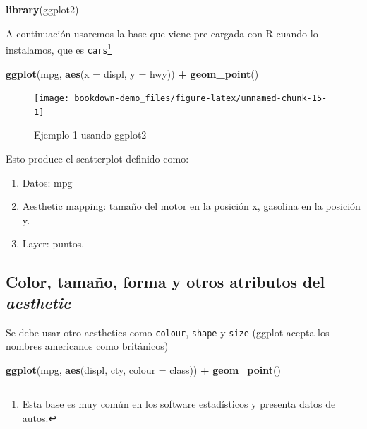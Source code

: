 \documentclass[12pt,]{book}
\newenvironment{Shaded}{\begin{snugshade}}{\end{snugshade}}
\newcommand{\KeywordTok}[1]{\textcolor[rgb]{0.13,0.29,0.53}{\textbf{#1}}}
\newcommand{\DataTypeTok}[1]{\textcolor[rgb]{0.13,0.29,0.53}{#1}}
\newcommand{\StringTok}[1]{\textcolor[rgb]{0.31,0.60,0.02}{#1}}
\newcommand{\OperatorTok}[1]{\textcolor[rgb]{0.81,0.36,0.00}{\textbf{#1}}}
\newcommand{\NormalTok}[1]{#1}
\providecommand{\tightlist}{%
  \setlength{\itemsep}{0pt}\setlength{\parskip}{0pt}}
\begin{document}
\begin{Shaded}
\begin{Highlighting}[]
\KeywordTok{library}\NormalTok{(ggplot2)}
\end{Highlighting}
\end{Shaded}

A continuación usaremos la base que viene pre cargada con R cuando lo
instalamos, que es \texttt{cars}\footnote{Esta base es muy común en los
  software estadísticos y presenta datos de autos.}

\begin{Shaded}
\begin{Highlighting}[]
\KeywordTok{ggplot}\NormalTok{(mpg, }\KeywordTok{aes}\NormalTok{(}\DataTypeTok{x =}\NormalTok{ displ, }\DataTypeTok{y =}\NormalTok{ hwy)) }\OperatorTok{+}\StringTok{ }\KeywordTok{geom_point}\NormalTok{()}
\end{Highlighting}
\end{Shaded}

\begin{figure}

{\centering \texttt{[image: bookdown-demo\_files/figure-latex/unnamed-chunk-15-1]} 

}

\caption{Ejemplo 1 usando ggplot2}\label{fig:unnamed-chunk-15}
\end{figure}

Esto produce el scatterplot definido como:

\begin{enumerate}
\def\labelenumi{\arabic{enumi}.}
\tightlist
\item
  Datos: mpg
\item
  Aesthetic mapping: tamaño del motor en la posición x, gasolina en la
  posición y.
\item
  Layer: puntos.
\end{enumerate}

\subsection{\texorpdfstring{Color, tamaño, forma y otros atributos del
\emph{aesthetic}}{Color, tamaño, forma y otros atributos del aesthetic}}\label{color-tamano-forma-y-otros-atributos-del-aesthetic}

Se debe usar otro aesthetics como \texttt{colour}, \texttt{shape} y
\texttt{size} (ggplot acepta los nombres americanos como británicos)

\begin{Shaded}
\begin{Highlighting}[]
\KeywordTok{ggplot}\NormalTok{(mpg, }\KeywordTok{aes}\NormalTok{(displ, cty, }\DataTypeTok{colour =}\NormalTok{ class)) }\OperatorTok{+}
\StringTok{  }\KeywordTok{geom_point}\NormalTok{() }
\end{Highlighting}
\end{Shaded}
\end{document}
